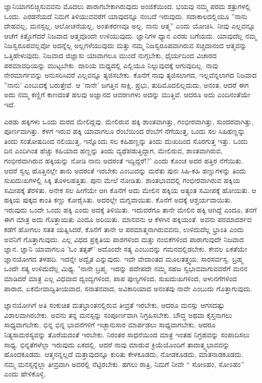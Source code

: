 ಜ್ಞಾನಿಯಾಗಲಿಚ್ಚಿಸುವವನು ಮೊದಲು ಪಾರಾಗಬೇಕಾಗಿರುವುದು ಅಂಜಿಕೆಯಿಂದ. ಭಯವು ನಮ್ಮ ಪರಮ ಶತ್ರುಗಳಲ್ಲಿ ಒಂದು. ಎರಡನೆಯದೆ ನಿಮಗೆ ತಿಳಿಯುವವರೆಗೆ ಯಾವುದನ್ನೂ ನಂಬದೆ ಇರುವುದು. ಸದಾಕಾಲದಲ್ಲಿಯೂ ''ನಾನು ದೇಹವಲ್ಲ, ಮನಸ್ಸಲ್ಲ, ಆಲೋಚನೆಯಲ್ಲ, ಅಂತಃಕರಣವೂ ಅಲ್ಲ. ನಾನು ಆತ್ಮ” ಎಂದು ಯೋಚಿಸಿ. ನೀವು ಎಲ್ಲವನ್ನೂ ಆಚೆಗೆ ಕಿತ್ತೊಗೆದರೆ ನಿಜವಾದ ಆತ್ಮವೊಂದೇ ಉಳಿಯುವುದು. ಜ್ಞಾನಿಗಳ ಧ್ಯಾನ ಎರಡು ಬಗೆಯದು. ಯಾವುದೆಲ್ಲ ನಮ್ಮ ನಿಜಸ್ವರೂಪವಲ್ಲವೋ ಅದನ್ನೆಲ್ಲ ಅಲ್ಲಗಳೆಯುವುದು ಮತ್ತು ನಮ್ಮ ನಿಜಸ್ವರೂಪವಾಗಿರುವ ಸಚ್ಚಿದಾನಂದ ಆತ್ಮವನ್ನು ಒತ್ತಿಹೇಳುವುದು. ನಿಜವಾದ ಜಿಜ್ಞಾಸು ಯಾವಾಗಲೂ ಮುಂದೆ ನುಗ್ಗಬೇಕು, ಧೈರ್ಯದಿಂದ ವಿಚಾರದ ಪರಮಾವಧಿಯನ್ನು ಮುಟ್ಟಬೇಕು. ದಾರಿಯ ಮಧ್ಯದಲ್ಲಿ ಎಲ್ಲಿಯೂ ನಿಲ್ಲುವುದಕ್ಕೆ ಆಗುವುದಿಲ್ಲ. ನಾವು ನೇರಮಾರ್ಗವನ್ನು ಅನುಸರಿಸಿದರೆ ಎಲ್ಲವನ್ನೂ ತ್ಯಜಿಸಬೇಕು. ಕೊನೆಗೆ ನಾವು ತ್ಯಜಿಸಲಾಗದ, ಇಲ್ಲವೆನ್ನಲಾಗದ ನಿಜವಾದ ''ನಾನು' ಎಂಬುದಕ್ಕೆ ಬರುತ್ತೇವೆ. ಆ 'ನಾನೇ' ಜಗತ್ತಿನ ಸಾಕ್ಷಿ, ಪ್ರಭು, ತುದಿಮೊದಲಿಲ್ಲದುದು, ಅನಂತ, ಆದರೆ ಈಗ ಅದು ನಮ್ಮ ಕಣ್ಣಿಗೆ ಕಾಣದಂತೆ ಹಲವು ಅಜ್ಞಾನದ ಆವರಣಗಳು ಅದನ್ನು ಮುತ್ತಿವೆ. ಆದರೂ ಅದು ಎಂದಿನಂತೆಯೇ ಇದೆ.

ಎರಡು ಹಕ್ಕಿಗಳು ಒಂದು ಮರದ ಮೇಲಿದ್ದವು. ಮೇಲಿರುವ ಹಕ್ಕಿ ಶಾಂತವಾಗಿತ್ತು, ಗಂಭೀರವಾಗಿತ್ತು, ಸುಂದರವಾಗಿತ್ತು, ಪೂರ್ಣವಾಗಿತ್ತು. ಕೆಳಗೆ ಇರುವ ಹಕ್ಕಿ ಯಾವಾಗಲೂ ರೆಂಬೆಯಿಂದ ರೆಂಬೆಗೆ ನೆಗೆಯುತ್ತ, ಒಂದು ಸಲ ಸಿಹಿಹಣ್ಣನ್ನು ತಿಂದು ಸಂತೋಷದಿಂದ ನಲಿಯುತ್ತ, ಇನ್ನೊಂದು ಸಲ ಕಹಿಹಣ್ಣನ್ನು ತಿಂದು ದುಃಖದಿಂದ ಸೊರಗುತ್ತ ಇತ್ತು. ಒಂದು ದಿನ ಎಂದಿಗಿಂತ ಹೆಚ್ಚು ಕಹಿಯಾದ ಹಣ್ಣನ್ನು ತಿಂದು ವ್ಯಥೆಪಡುತ್ತಿದ್ದಾಗ, ಮೇಲಿರುವ, ಶಾಂತವಾಗಿರುವ, ಗಂಭೀರವಾಗಿರುವ ಹಕ್ಕಿಯನ್ನು ನೋಡಿ ನಾನು ಅದರಂತೆ ಇದ್ದಿದ್ದರೆ!?' ಎಂದು ಕೊಂಚ ಅದರ ಹತ್ತಿರ ನೆಗೆಯಿತು. ಆದರೆ ಸ್ವಲ್ಪ ಹೊತ್ತಿನಲ್ಲೇ ತಾನು ಅದರಂತೆ ಇರಬೇಕು ಎಂಬುದನ್ನು ಮರೆತು ಪುನಃ ಸಿಹಿ-ಕಹಿ ಹಣ್ಣುಗಳನ್ನು ತಿಂದು ಸುಖದುಃಖಗಳಲ್ಲಿ ಸಿಕ್ಕಿ ತೊಳಲಹತ್ತಿತು. ಪುನಃ ಮೇಲೆ ನೋಡಿತು. ಶಾಂತಭಾವದಲ್ಲಿ ಗಂಭೀರವಾಗಿರುವ ಹಕ್ಕಿಯ ಸಮೀಪಕ್ಕೆ ತೆರಳಿತು. ಅನೇಕ ಸಲ ಹೀಗೆಯೇ ಆಗಿ ಕೊನೆಗೆ ಅದು ಮೇಲಿನ ಹಕ್ಕಿಯ ಅತ್ಯಂತ ಸಮೀಪಕ್ಕೆ ಹೋಯಿತು. ಆ ಹಕ್ಕಿಯ ಪುಕ್ಕದ ಕಾಂತಿ ಕಣ್ಣು ಕೋರೈಸಿತು. ಅದರಲ್ಲೇ ಮಗ್ನವಾಯಿತು. ಕೊನೆಗೆ ಅದಕ್ಕೆ ಆಶ್ಚರ್ಯವಾಯಿತು. ಇರುವುದು ಒಂದೇ ಒಂದು ಹಕ್ಕಿ ಎಂದು ಅದಕ್ಕೆ ತಿಳಿಯಿತು. ಇದುವರೆಗೂ ತಾನೇ ಮೇಲಿನ ಹಕ್ಕಿ ಆಗಿದ್ದೆ ಎಂದೂ, ತನಗೆ ಈಗ ಮಾತ್ರ ಅದು ಗೊತ್ತಾಯಿತು ಎಂದೂ ಅರಿಯಿತು. ಮಾನವನು ಆ ಕೆಳಗಿನ ಹಕ್ಕಿಯಂತೆ. ಅವನು ಪರಮಾದರ್ಶದ ಕಡೆಗೆ ಹೋಗಲು ಸತತ ಯತ್ನಿಸಿದರೆ, ಕೊನೆಗೆ ತಾನೇ ಆ ಪರಮಾತ್ಮನಾಗಿರುವವನು, ಉಳಿದುದೆಲ್ಲ ಭ್ರಾಂತಿ ಎಂದು ಅವನಿಗೆ ಗೊತ್ತಾಗುವುದು. ಎಲ್ಲ ವಿಧದ ಪ್ರಕೃತಿಯ ಪಾಶಗಳಿಂದ ಮತ್ತು ನಂಬಿಕೆಗಳಿಂದ ಪಾರಾಗುವುದೇ ನಿಜವಾದ ಜ್ಞಾನ. ಜ್ಞಾನಿ ಯಾವಾಗಲೂ 'ಓಂ ತತ್ಸತ್' ಅದೊಂದೇ ಸತ್ಯ ಎಂಬುದನ್ನು ಗಮನದಲ್ಲಿಡಬೇಕು. ಕೇವಲ ಏಕತೆಯೇ ಜ್ಞಾನಯೋಗದ ತಳಹದಿ. ಇದನ್ನೇ ಅದ್ವೈತ ಎನ್ನುವುದು. ಇದೇ ವೇದಾಂತದ ಮೂಲತತ್ತ್ವಯ, ಸಾರಸರ್ವಸ್ವ. ಬ್ರಹ್ಮ ಒಂದೇ ಸತ್ಯ ಉಳಿದುದೆಲ್ಲ ಮಿಥ್ಯ. "ನಾನೇ ಬ್ರಹ್ಮ. ಇದನ್ನು ಪದೇಪದೇ ನಮ್ಮ ಸಹಜ ಸ್ವಭಾವವಾಗುವವರೆಗೆ ಮನನ ಮಾಡಿದರೆ ಮಾತ್ರ ಎಲ್ಲ ವಿಧವಾದ ದ್ವಂದ್ವಗಳಿಂದ, ಪಾಪ ಪುಣ್ಯಗಳಿಂದ, ಸುಖದುಃಖಗಳಿಂದ, ಅಳುನಗೆಗಳಿಂದ ಪಾರಾದ, ಏಕಮೇವಾದ್ವಿತೀಯವಾದ, ಸನಾತನವಾದ, ಅವಿಕಾರಿಯಾದ ಅನಂತವು ನಾವೇ ಎಂಬುದು ಗೊತ್ತಾಗುವುದು.

ಜ್ಞಾನಯೋಗಿಗೆ ಅತಿ ಸಂಕುಚಿತ ಮತಭ್ರಾಂತನಲ್ಲಿರುವ ತೀವ್ರತೆ ಇರಬೇಕು, ಆದರೂ ಮನಸ್ಸು ಆಗಸದಷ್ಟು ವಿಶಾಲವಾಗಿರಬೇಕು. ಅವನು ತನ್ನ ಮನಸ್ಸನ್ನು ಸಂಪೂರ್ಣವಾಗಿ ನಿಗ್ರಹಿಸಬೇಕು. ಬೌದ್ಧ ಅಥವಾ ಕೈಸ್ತನಾಗಲು ಸಾಧ್ಯವಾಗಬೇಕು. ಭಿನ್ನ ಭಿನ್ನ ಭಾವನೆಗಳಿಗೆ ಇಚ್ಛಾನುಸಾರ ಮಾರ್ಪಡಲು ಸಾಧ್ಯವಾಗಬೇಕು. ಆದರೂ ನಿತ್ಯಸಾಮರಸ್ಯವನ್ನು ತೊರೆಯದಂತೆ ಇರಬೇಕು. ನಿರಂತರ ಸಾಧನೆಯಿಂದ ಮಾತ್ರ ಇಂತಹ ನಿಗ್ರಹವನ್ನು ಸಂಪಾದಿಸಲು ಸಾಧ್ಯ. ಭಿನ್ನತೆಗಳೆಲ್ಲಾ ಇರುವುದು ಏಕದಲ್ಲಿ. ಆದರೆ ನಾವು ಮಾಡುವ ಕ್ರಿಯೆಯೊಂದಿಗೆ ತಾದಾತ್ಮ್ಯಭಾವವನ್ನು ಹೊಂದಕೂಡದು. ಆತ್ಮನನ್ನಲ್ಲದೆ ಮತ್ತಾವುದನ್ನೂ ಕುರಿತು ಕೇಳಕೂಡದು, ನೋಡಕೂಡದು, ಮಾತನಾಡಕೂಡದು. ನಮ್ಮ ಮನಸ್ಸನ್ನೆಲ್ಲಾ ತೀವ್ರವಾಗಿ ಅದರಲ್ಲಿ ನೆಟ್ಟಿರಬೇಕು. ಹಗಲು ರಾತ್ರಿ, ನಿಮಗೆ ನೀವೇ `` ಸೋಽಹಂ, ಸೋಽಹಂ'' ಎಂದು ಹೇಳಿಕೊಳ್ಳಿ.

